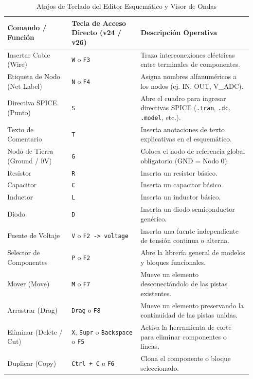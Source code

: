 \documentclass[11pt, a4paper]{article}
\begin{document}
\begin{table}[h!]
\centering
\caption{Atajos de Teclado del Editor Esquemático y Visor de Ondas}
\label{tab:atajos}
\footnotesize
\renewcommand{\arraystretch}{1.3}
\begin{tabularx}{\textwidth}{@{} l l X @{}}
\toprule
\textbf{Comando / Función} & \textbf{Tecla de Acceso Directo (v24 / v26)} & \textbf{Descripción Operativa} \\
\midrule
Insertar Cable (Wire) & \texttt{W} o \texttt{F3} & Traza interconexiones eléctricas entre terminales de componentes. \\
Etiqueta de Nodo (Net Label) & \texttt{N} o \texttt{F4} & Asigna nombres alfanuméricos a los nodos (ej. IN, OUT, V\_ADC). \\
Directiva SPICE. (Punto) & \texttt{S} & Abre el cuadro para ingresar directivas SPICE (\texttt{.tran}, \texttt{.dc}, \texttt{.model}, etc.). \\
Texto de Comentario & \texttt{T} & Inserta anotaciones de texto explicativas en el esquemático. \\
Nodo de Tierra (Ground / 0V) & \texttt{G} & Coloca el nodo de referencia global obligatorio (GND = Nodo 0). \\
Resistor & \texttt{R} & Inserta un resistor básico. \\
Capacitor & \texttt{C} & Inserta un capacitor básico. \\
Inductor & \texttt{L} & Inserta un inductor básico. \\
Diodo & \texttt{D} & Inserta un diodo semiconductor genérico. \\
Fuente de Voltaje & \texttt{V} o \texttt{F2 -> voltage} & Inserta una fuente independiente de tensión continua o alterna. \\
Selector de Componentes & \texttt{P} o \texttt{F2} & Abre la librería general de modelos y bloques funcionales. \\
Mover (Move) & \texttt{M} o \texttt{F7} & Mueve un elemento desconectándolo de las pistas existentes. \\
Arrastrar (Drag) & \texttt{Drag} o \texttt{F8} & Mueve un elemento preservando la continuidad de las pistas unidas. \\
Eliminar (Delete / Cut) & \texttt{X}, \texttt{Supr} o \texttt{Backspace} o \texttt{F5} & Activa la herramienta de corte para eliminar componentes o líneas. \\
Duplicar (Copy) & \texttt{Ctrl + C} o \texttt{F6} & Clona el componente o bloque seleccionado. \\

\end{tabularx}
\end{table}
\end{document}
